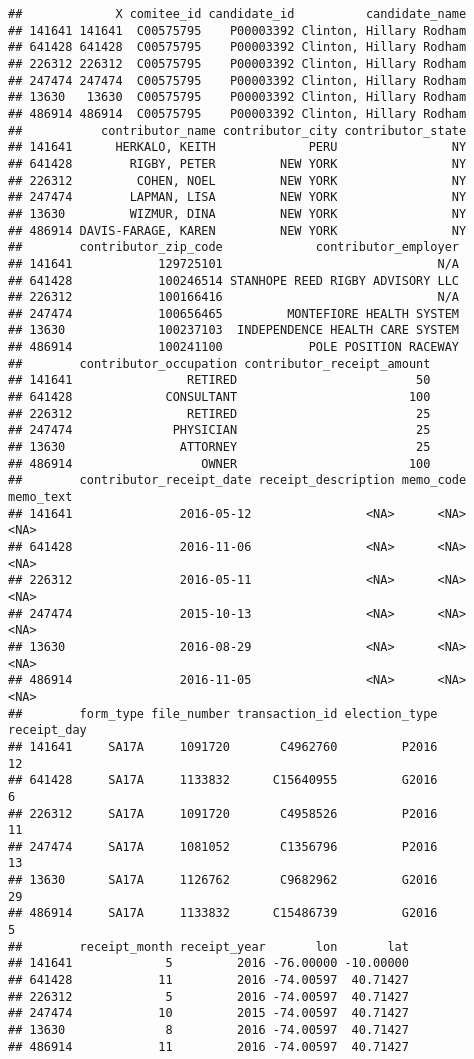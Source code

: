 \documentclass[]{article}
\begin{document}
\begin{verbatim}
##             X comitee_id candidate_id          candidate_name
## 141641 141641  C00575795    P00003392 Clinton, Hillary Rodham
## 641428 641428  C00575795    P00003392 Clinton, Hillary Rodham
## 226312 226312  C00575795    P00003392 Clinton, Hillary Rodham
## 247474 247474  C00575795    P00003392 Clinton, Hillary Rodham
## 13630   13630  C00575795    P00003392 Clinton, Hillary Rodham
## 486914 486914  C00575795    P00003392 Clinton, Hillary Rodham
##           contributor_name contributor_city contributor_state
## 141641      HERKALO, KEITH             PERU                NY
## 641428        RIGBY, PETER         NEW YORK                NY
## 226312         COHEN, NOEL         NEW YORK                NY
## 247474        LAPMAN, LISA         NEW YORK                NY
## 13630         WIZMUR, DINA         NEW YORK                NY
## 486914 DAVIS-FARAGE, KAREN         NEW YORK                NY
##        contributor_zip_code             contributor_employer
## 141641            129725101                              N/A
## 641428            100246514 STANHOPE REED RIGBY ADVISORY LLC
## 226312            100166416                              N/A
## 247474            100656465         MONTEFIORE HEALTH SYSTEM
## 13630             100237103  INDEPENDENCE HEALTH CARE SYSTEM
## 486914            100241100            POLE POSITION RACEWAY
##        contributor_occupation contributor_receipt_amount
## 141641                RETIRED                         50
## 641428             CONSULTANT                        100
## 226312                RETIRED                         25
## 247474              PHYSICIAN                         25
## 13630                ATTORNEY                         25
## 486914                  OWNER                        100
##        contributor_receipt_date receipt_description memo_code memo_text
## 141641               2016-05-12                <NA>      <NA>      <NA>
## 641428               2016-11-06                <NA>      <NA>      <NA>
## 226312               2016-05-11                <NA>      <NA>      <NA>
## 247474               2015-10-13                <NA>      <NA>      <NA>
## 13630                2016-08-29                <NA>      <NA>      <NA>
## 486914               2016-11-05                <NA>      <NA>      <NA>
##        form_type file_number transaction_id election_type receipt_day
## 141641     SA17A     1091720       C4962760         P2016          12
## 641428     SA17A     1133832      C15640955         G2016           6
## 226312     SA17A     1091720       C4958526         P2016          11
## 247474     SA17A     1081052       C1356796         P2016          13
## 13630      SA17A     1126762       C9682962         G2016          29
## 486914     SA17A     1133832      C15486739         G2016           5
##        receipt_month receipt_year       lon       lat
## 141641             5         2016 -76.00000 -10.00000
## 641428            11         2016 -74.00597  40.71427
## 226312             5         2016 -74.00597  40.71427
## 247474            10         2015 -74.00597  40.71427
## 13630              8         2016 -74.00597  40.71427
## 486914            11         2016 -74.00597  40.71427
\end{verbatim}
\end{document}
